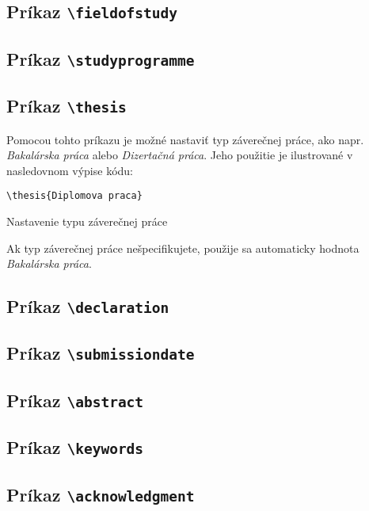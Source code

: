 \subsection{Príkaz {\tt \textbackslash{}fieldofstudy}}
\subsection{Príkaz {\tt \textbackslash{}studyprogramme}}

\subsection{Príkaz {\tt \textbackslash{}thesis}}

Pomocou tohto príkazu je možné nastaviť typ záverečnej práce, ako napr. {\it Bakalárska práca} alebo {\it Dizertačná práca}. Jeho použitie je ilustrované v nasledovnom výpise kódu:

\begin{listing}[ht]
\begin{verbatim}
\thesis{Diplomova praca}
\end{verbatim}
\caption{Nastavenie typu záverečnej práce}
\end{listing}

Ak typ záverečnej práce nešpecifikujete, použije sa automaticky hodnota {\it Bakalárska práca}.

\subsection{Príkaz {\tt \textbackslash{}declaration}}
\subsection{Príkaz {\tt \textbackslash{}submissiondate}}
\subsection{Príkaz {\tt \textbackslash{}abstract}}
\subsection{Príkaz {\tt \textbackslash{}keywords}}
\subsection{Príkaz {\tt \textbackslash{}acknowledgment}}


